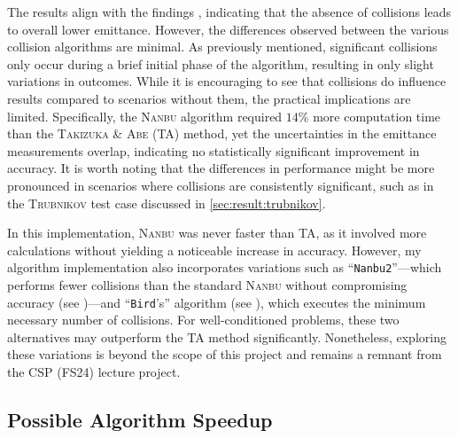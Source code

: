 The results align with the findings \cite[595]{Mitchell2015}, indicating that the absence of collisions leads to overall lower emittance. However, the differences observed between the various collision algorithms are minimal. As previously mentioned, significant collisions only occur during a brief initial phase of the algorithm, resulting in only slight variations in outcomes. While it is encouraging to see that collisions do influence results compared to scenarios without them, the practical implications are limited. Specifically, the \textsc{Nanbu} algorithm required $14\%$ more computation time than the \textsc{Takizuka \& Abe} (TA) method, yet the uncertainties in the emittance measurements overlap, indicating no statistically significant improvement in accuracy. It is worth noting that the differences in performance might be more pronounced in scenarios where collisions are consistently significant, such as in the \textsc{Trubnikov} test case discussed in \ref{sec:result:trubnikov}. 

In this implementation, \textsc{Nanbu} was never faster than TA, as it involved more calculations without yielding a noticeable increase in accuracy. However, my algorithm implementation also incorporates variations such as ``\texttt{Nanbu2}''—which performs fewer collisions than the standard \textsc{Nanbu} without compromising accuracy (see \cite[7]{Dimarco2010})—and ``\texttt{Bird}'s'' algorithm (see \cite[8]{Dimarco2010}), which executes the minimum necessary number of collisions. For well-conditioned problems, these two alternatives may outperform the TA method significantly. Nonetheless, exploring these variations is beyond the scope of this project and remains a remnant from the CSP (FS24) lecture project.


\subsection{Possible Algorithm Speedup}

